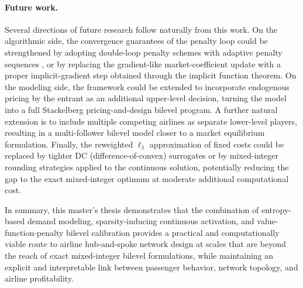 \paragraph{Future work.}
Several directions of future research follow naturally from this work. On the algorithmic side, the convergence guarantees of the penalty loop could be strengthened by adopting double-loop penalty schemes with adaptive penalty sequences \cite{LuMei2024}, or by replacing the gradient-like market-coefficient update with a proper implicit-gradient step obtained through the implicit function theorem. On the modeling side, the framework could be extended to incorporate endogenous pricing by the entrant as an additional upper-level decision, turning the model into a full Stackelberg pricing-and-design bilevel program. A further natural extension is to include multiple competing airlines as separate lower-level players, resulting in a multi-follower bilevel model closer to a market equilibrium formulation. Finally, the reweighted $\ell_1$ approximation of fixed costs could be replaced by tighter DC (difference-of-convex) surrogates or by mixed-integer rounding strategies applied to the continuous solution, potentially reducing the gap to the exact mixed-integer optimum at moderate additional computational cost.

In summary, this master's thesis demonstrates that the combination of entropy-based demand modeling, sparsity-inducing continuous activation, and value-function-penalty bilevel calibration provides a practical and computationally viable route to airline hub-and-spoke network design at scales that are beyond the reach of exact mixed-integer bilevel formulations, while maintaining an explicit and interpretable link between passenger behavior, network topology, and airline profitability.
